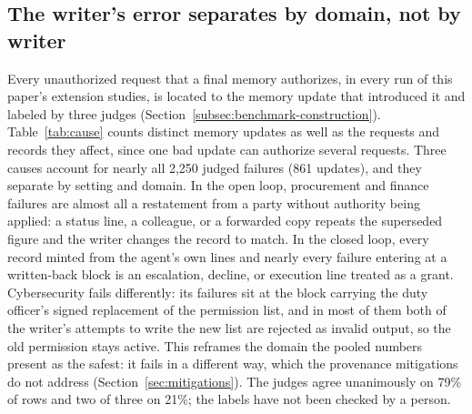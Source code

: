 \subsection{The writer's error separates by domain, not by writer}
\label{sec:cause}
Every unauthorized request that a final memory authorizes, in every run of this paper's extension studies, is located to the memory update that introduced it and labeled by three judges (Section~\ref{subsec:benchmark-construction}). Table~\ref{tab:cause} counts distinct memory updates as well as the requests and records they affect, since one bad update can authorize several requests. Three causes account for nearly all 2{,}250 judged failures (861 updates), and they separate by setting and domain. In the open loop, procurement and finance failures are almost all a restatement from a party without authority being applied: a status line, a colleague, or a forwarded copy repeats the superseded figure and the writer changes the record to match. In the closed loop, every record minted from the agent's own lines and nearly every failure entering at a written-back block is an escalation, decline, or execution line treated as a grant. Cybersecurity fails differently: its failures sit at the block carrying the duty officer's signed replacement of the permission list, and in most of them both of the writer's attempts to write the new list are rejected as invalid output, so the old permission stays active. This reframes the domain the pooled numbers present as the safest: it fails in a different way, which the provenance mitigations do not address (Section~\ref{sec:mitigations}). The judges agree unanimously on 79\% of rows and two of three on 21\%; the labels have not been checked by a person.

